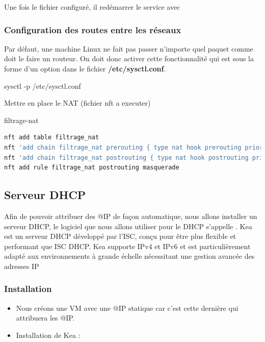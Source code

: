 \documentclass{article}
\begin{document}
Une fois le fichier configuré, il redémarrer le service avec 

\subsubsection{Configuration des routes entre les réseaux}
Par défaut, une machine Linux ne fait pas passer n'importe quel paquet  comme doit le faire un routeur. On doit donc activer cette fonctionnalité qui est sous la forme d'un option dans le fichier \textbf{/etc/sysctl.conf}.

\begin{command}
    sysctl -p /etc/sysctl.conf
\end{command}

Mettre en place le NAT (fichier nft a executer) 
\begin{codebox}{filtrage-nat}
\begin{lstlisting}[language=Bash]
nft add table filtrage_nat
nft 'add chain filtrage_nat prerouting { type nat hook prerouting priority 0 ; }'
nft 'add chain filtrage_nat postrouting { type nat hook postrouting priority 0 ; }'
nft add rule filtrage_nat postrouting masquerade
\end{lstlisting}
\end{codebox}

\subsection{Serveur DHCP}
Afin de pouvoir attribuer des @IP de façon automatique, nous allons installer un serveur DHCP, le logiciel que nous allons utiliser pour le DHCP s'appelle . Kea est un serveur DHCP développé par l'ISC, conçu pour être plus flexible et performant que ISC DHCP. Kea supporte IPv4 et IPv6 et est particulièrement adapté aux environnements à grande échelle nécessitant une gestion avancée des adresses IP


\subsubsection{Installation}
\begin{itemize}
    \item Nous créons une VM avec une @IP statique car c’est cette dernière qui attribuera les @IP.
    \item Installation de Kea : 
\end{itemize}
\end{document}
